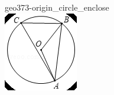 \documentclass[12pt]{article}
\begin{document}
\begin{center}
\begin{minipage}{0.32\textwidth}
\end{minipage}
\hfill\begin{minipage}{0.32\textwidth}\centering
geo373-origin\_circle\_enclose\\
\includegraphics[width=0.95\linewidth]{out_rommath_origin/items/geo373-origin/assets/figure_circle.png}
\end{minipage}
\par
\end{center}
\bigskip
\end{document}
